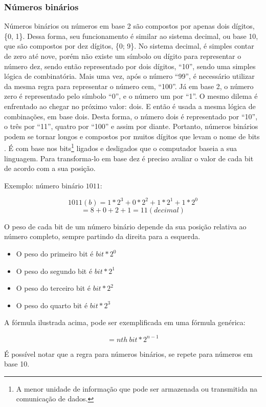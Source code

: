 \subsubsection{Números binários}

Números binários ou números em base 2 são compostos por apenas dois dígitos, \{0, 1\}. Dessa forma, seu funcionamento é similar ao sistema decimal, ou base 10, que são compostos por dez dígitos, \{0; 9\}. No sistema decimal, é simples contar de zero até nove, porém não existe um símbolo ou dígito para representar o número dez, sendo então representado por dois dígitos, ``10'', sendo uma simples lógica de combinatória. Mais uma vez, após o número ``99'', é necessário utilizar da mesma regra para representar o número cem, ``100''. Já em base 2, o número zero é representado pelo símbolo ``0'', e o número um por ``1''. O mesmo dilema é enfrentado ao chegar no próximo valor: dois. E então é usada a mesma lógica de combinações, em base dois. Desta forma, o número dois é representado por ``10'', o três por ``11'', quatro por ``100'' e assim por diante. Portanto, números binários podem se tornar longos e compostos por muitos dígitos que levam o nome de bits \cite{6}. É com base nos \label{bits}bits\footnote{A menor unidade de informação que pode ser armazenada ou transmitida na comunicação de dados.} ligados e desligados que o computador baseia a sua linguagem. Para transforma-lo em base dez é preciso avaliar o valor de cada bit de acordo com a sua posição. 

Exemplo: número binário $1011$:

\[ 1011(b) = 1*2^3 + 0*2^2 + 1*2^1 + 1*2^0\]
\[ = 8 + 0 + 2 + 1 = 11(decimal)\]

O peso de cada bit de um número binário depende da sua posição relativa ao número completo, sempre partindo da direita para a esquerda.

\begin{itemize}
  \item O peso do primeiro bit é $bit * 2^0$
  \item O peso do segundo bit é $bit * 2^1$
  \item O peso do terceiro bit é $bit * 2^2$
  \item O peso do quarto bit é $bit * 2^3$
\end{itemize}

A fórmula ilustrada acima, pode ser exemplificada em uma fórmula genérica: 

\[= nth\: bit * 2^{n-1}\]

É possível notar que a regra para números binários, se repete para números em base 10.

